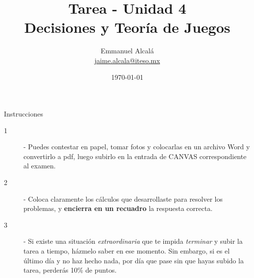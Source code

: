 \documentclass[12pt]{scrartcl} %
\title{Tarea - Unidad 4 \\ \normalsize Decisiones y Teoría de Juegos}
\author{Emmanuel Alcalá\\ \url{jaime.alcala@iteso.mx}}
\date{\today}
\begin{document}
\maketitle
\begin{summarybox}{Instrucciones}

  \begin{description}
      \item[1] - Puedes contestar en papel, tomar fotos y colocarlas en un archivo Word y convertirlo a pdf, luego subirlo en la entrada de CANVAS correspondiente al examen. 
      \item[2] - Coloca claramente los cálculos que desarrollaste para resolver los problemas, y \textbf{encierra en un recuadro} la respuesta correcta. 
      \item[3] - Si existe una situación \textit{extraordinaria} que te impida \textit{terminar} y subir la tarea a tiempo, házmelo saber en ese momento. Sin embargo, si es el último día y no haz hecho nada, por día que pase sin que hayas subido la tarea, perderás 10\% de puntos.
  \end{description}
  
\end{summarybox}

\begin{center}
  \Coffeecup[1.5]
\end{center}
\end{document}
